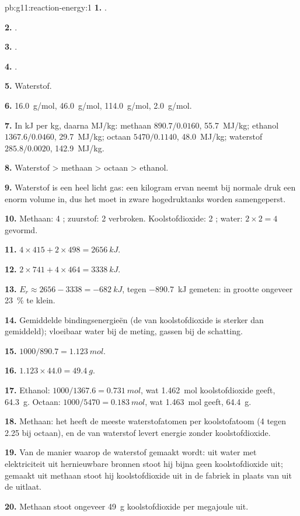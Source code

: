 \begin{solution}{pb:g11:reaction-energy:1}
\textbf{1.} .

\textbf{2.} .

\textbf{3.} .

\textbf{4.} .

\textbf{5.} Waterstof.

\textbf{6.} \qty{16.0}{g/mol}, \qty{46.0}{g/mol}, \qty{114.0}{g/mol},
\qty{2.0}{g/mol}.

\textbf{7.} In \si{kJ} per \si{kg}, daarna \si{MJ/kg}: methaan
$890.7 / 0.0160$, \qty{55.7}{MJ/kg}; ethanol $1367.6 / 0.0460$,
\qty{29.7}{MJ/kg}; octaan $5470 / 0.1140$, \qty{48.0}{MJ/kg}; waterstof
$285.8 / 0.0020$, \qty{142.9}{MJ/kg}.

\textbf{8.} Waterstof > methaan > octaan > ethanol.

\textbf{9.} Waterstof is een heel licht gas: een kilogram ervan neemt bij
normale druk een enorm volume in, dus het moet in zware hogedruktanks
worden samengeperst.

\textbf{10.} Methaan: 4 ; zuurstof: 2  verbroken.
Koolstofdioxide: 2 ; water: $2 \times 2 = 4$  gevormd.

\textbf{11.} $4 \times 415 + 2 \times 498 = \qty{2656}{kJ}$.

\textbf{12.} $2 \times 741 + 4 \times 464 = \qty{3338}{kJ}$.

\textbf{13.} $E_r \approx 2656 - 3338 = \qty{-682}{kJ}$, tegen
\qty{-890.7}{kJ} gemeten: in grootte ongeveer \qty{23}{\percent} te
klein.

\textbf{14.} Gemiddelde bindingsenergieën (de  van
koolstofdioxide is sterker dan gemiddeld); vloeibaar water bij de
meting, gassen bij de schatting.

\textbf{15.} $1000 / 890.7 = \qty{1.123}{mol}$.

\textbf{16.} $1.123 \times 44.0 = \qty{49.4}{g}$.

\textbf{17.} Ethanol: $1000 / 1367.6 = \qty{0.731}{mol}$, wat
\qty{1.462}{mol} koolstofdioxide geeft, \qty{64.3}{g}. Octaan:
$1000 / 5470 = \qty{0.183}{mol}$, wat \qty{1.463}{mol} geeft,
\qty{64.4}{g}.

\textbf{18.} Methaan: het heeft de meeste waterstofatomen per
koolstofatoom (4 tegen 2.25 bij octaan), en de  van waterstof
levert energie zonder koolstofdioxide.

\textbf{19.} Van de manier waarop de waterstof gemaakt wordt: uit water
met elektriciteit uit hernieuwbare bronnen stoot hij bijna geen
koolstofdioxide uit; gemaakt uit methaan stoot hij koolstofdioxide uit
in de fabriek in plaats van uit de uitlaat.

\textbf{20.} Methaan stoot ongeveer \qty{49}{g} koolstofdioxide per
megajoule uit.
\end{solution}
